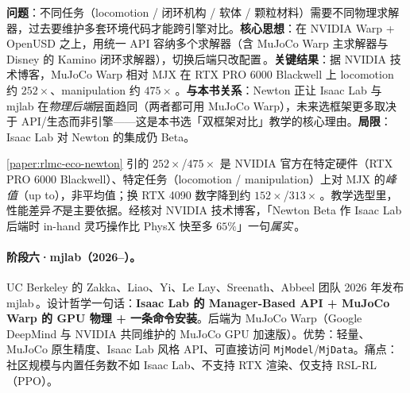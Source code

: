 \begin{paper}\label{paper:rlmc-eco-newton}
\textbf{问题}：不同任务（locomotion / 闭环机构 / 软体 / 颗粒材料）需要不同物理求解器，过去要维护多套环境代码才能跨引擎对比。\textbf{核心思想}：在 NVIDIA Warp + OpenUSD 之上，用统一 API 容纳多个求解器（含 MuJoCo Warp 主求解器与 Disney 的 Kamino 闭环求解器），切换后端只改配置\,\cite{newton2025}。\textbf{关键结果}：据 NVIDIA 技术博客，MuJoCo Warp 相对 MJX 在 RTX PRO 6000 Blackwell 上 locomotion 约 $252\times$、manipulation 约 $475\times$\,\cite{newton2025blog}。\textbf{与本书关系}：Newton 正让 Isaac Lab 与 mjlab 在\emph{物理后端}层面趋同（两者都可用 MuJoCo Warp），未来选框架更多取决于 API/生态而非引擎——这是本书选「双框架对比」教学的核心理由。\textbf{局限}：Isaac Lab 对 Newton 的集成仍 Beta。
\end{paper}

\begin{pitfall}
\cref{paper:rlmc-eco-newton} 引的 $252\times$/$475\times$ 是 NVIDIA 官方在特定硬件（RTX PRO 6000 Blackwell）、特定任务（locomotion / manipulation）上对 MJX 的\emph{峰值}（up to），非平均值；换 RTX 4090 数字降到约 $152\times$/$313\times$\,\cite{newton2025blog}。教学选型里，性能差异\emph{不}是主要依据。经核对 NVIDIA 技术博客，「Newton Beta 作 Isaac Lab 后端时 in-hand 灵巧操作比 PhysX 快至多 $65\%$」一句\emph{属实}\,\cite{newton2025blog}。
\end{pitfall}

\paragraph{阶段六·mjlab（2026--）。}UC Berkeley 的 Zakka、Liao、Yi、Le Lay、Sreenath、Abbeel 团队 2026 年发布 mjlab\,\cite{mjlab2026}。设计哲学一句话：\textbf{Isaac Lab 的 Manager-Based API + MuJoCo Warp 的 GPU 物理 + 一条命令安装}。后端为 MuJoCo Warp（Google DeepMind 与 NVIDIA 共同维护的 MuJoCo GPU 加速版）。优势：轻量、MuJoCo 原生精度、Isaac Lab 风格 API、可直接访问 \verb|MjModel|/\verb|MjData|。痛点：社区规模与内置任务数不如 Isaac Lab、不支持 RTX 渲染、仅支持 RSL-RL（PPO）。

